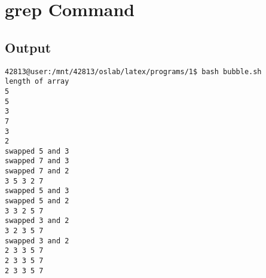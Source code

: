 \documentclass[pdftex,12pt,a4paper]{report}
\begin{document}
\section*{grep Command}



\subsection*{Output}
\begin{lstlisting}
42813@user:/mnt/42813/oslab/latex/programs/1$ bash bubble.sh 
length of array
5 
5
3
7
3
2
swapped 5 and 3
swapped 7 and 3
swapped 7 and 2
3 5 3 2 7
swapped 5 and 3
swapped 5 and 2
3 3 2 5 7
swapped 3 and 2
3 2 3 5 7
swapped 3 and 2
2 3 3 5 7
2 3 3 5 7
2 3 3 5 7

\end{lstlisting}
\end{document}
